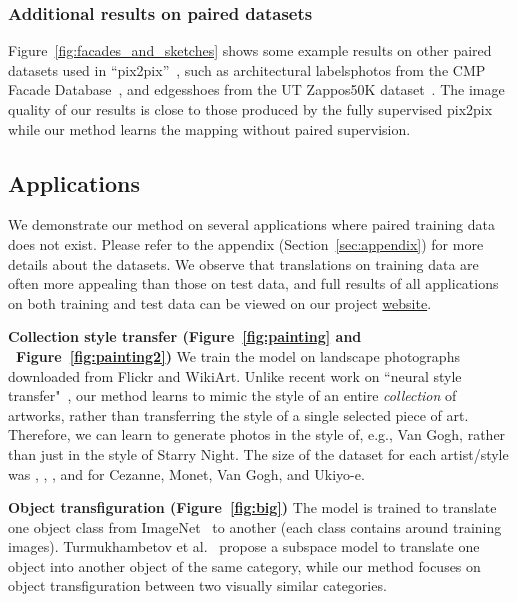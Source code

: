 \documentclass[10pt,twocolumn,letterpaper]{article}
\newcommand{\reffig}[1]{Figure~\ref{fig:#1}}
\newcommand{\refsec}[1]{Section~\ref{sec:#1}}
\newcommand{\lblsec}[1]{\label{sec:#1}}
\newcommand{\shortcite}[1]{\cite{#1}}
\begin{document}
\vspace{-1 mm}
\subsubsection{Additional results on paired datasets}
\vspace{-1 mm}
\reffig{facades_and_sketches} shows some example results on other paired datasets used in ``pix2pix''~\cite{isola2016image}, such as architectural labelsphotos from the CMP Facade Database~\cite{Tylecek13}, and edgesshoes from the UT Zappos50K
dataset~\cite{yu2014fine}. The image quality of our results is close to those produced by the fully supervised pix2pix while our method learns the mapping without paired supervision. 


\vspace{-1 mm}
\subsection{Applications}
\lblsec{application}
\vspace{-1 mm}

We demonstrate our method on several applications where paired training data does not exist. Please refer to the appendix (\refsec{appendix}) for more details about the datasets. We observe that translations on training data are often more appealing than those on test data, and full results of all applications on both training and test data can be viewed on our project \href{https://junyanz.github.io/CycleGAN/}{website}.



{\bf Collection style transfer (\reffig{painting} and ~\reffig{painting2})}  We train the model on landscape photographs downloaded from Flickr and WikiArt. Unlike recent work on ``neural style transfer"~\cite{gatys2015neural}, our method learns to mimic the style of an entire \emph{collection} of artworks, rather than transferring the style of a single selected piece of art. Therefore, we can learn to generate photos in the style of, e.g., Van Gogh, rather than just in the style of Starry Night. The size of the dataset for each artist/style was , , , and  for Cezanne, Monet, Van Gogh, and Ukiyo-e.

{\bf Object transfiguration (\reffig{big})} The model is trained to translate one object class from ImageNet~\cite{deng2009imagenet} to another (each class contains around  training images). Turmukhambetov et al.~\shortcite{turmukhambetov2015modeling} propose a subspace model to translate one object into another object of the same category, while our method focuses on object transfiguration between two visually similar categories. 
\end{document}
